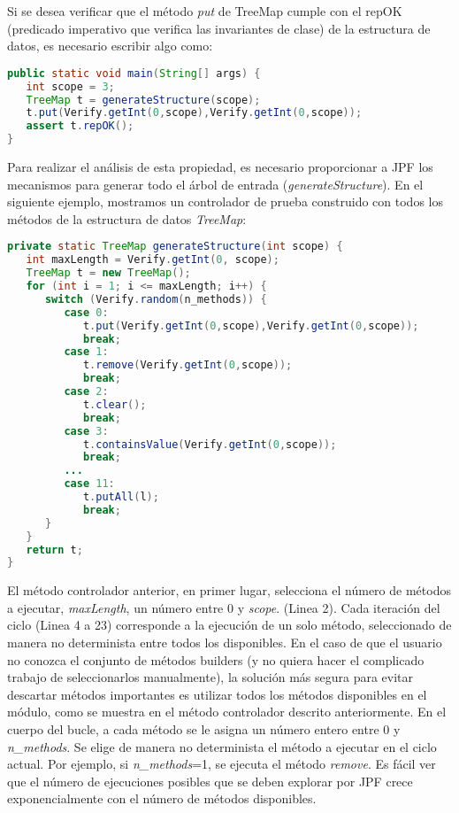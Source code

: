 Si se desea verificar que el método \emph{put}  de TreeMap cumple con el repOK (predicado imperativo que verifica las invariantes de clase) de la estructura de datos, es necesario escribir algo como: 
\vspace{5pt} 


\begin{lstlisting}[caption={Probando el método put de TreeMap con JPF},label={lst:label},language=Java,captionpos=b]
public static void main(String[] args) {
   int scope = 3;
   TreeMap t = generateStructure(scope);
   t.put(Verify.getInt(0,scope),Verify.getInt(0,scope));
   assert t.repOK();
}
\end{lstlisting}

Para realizar el análisis de esta propiedad, es necesario proporcionar a JPF los mecanismos para generar todo el árbol de entrada (\textit{generateStructure}). 
En el siguiente ejemplo, mostramos un controlador de prueba construido con todos los métodos de la estructura de datos \textit{TreeMap}:
\vspace{5pt} 

\begin{lstlisting}[caption={Controlador con todos los métodos},label={lst:driverAPI},language=Java,captionpos=b]
private static TreeMap generateStructure(int scope) {
   int maxLength = Verify.getInt(0, scope);
   TreeMap t = new TreeMap();
   for (int i = 1; i <= maxLength; i++) {
      switch (Verify.random(n_methods)) {
         case 0:
            t.put(Verify.getInt(0,scope),Verify.getInt(0,scope));
            break;
         case 1:
            t.remove(Verify.getInt(0,scope));
            break;						
         case 2:
            t.clear();
            break;
         case 3:
            t.containsValue(Verify.getInt(0,scope));
            break;
         ...
         case 11: 
            t.putAll(l);
            break;
      }
   }
   return t;
}
\end{lstlisting}

El método controlador anterior, en primer lugar, selecciona el número de métodos a ejecutar, \textit{maxLength}, un número entre 0 y \textit{scope}. (Linea 2). Cada iteración del ciclo (Linea 4 a 23) corresponde a la ejecución de un solo método, seleccionado de manera no determinista entre todos los disponibles. En el caso de que el usuario no conozca el conjunto de métodos builders (y no quiera hacer el complicado trabajo de seleccionarlos manualmente), la solución más segura para evitar descartar métodos importantes es utilizar todos los métodos disponibles en el módulo, como se muestra en el método controlador descrito anteriormente. En el cuerpo del bucle, a cada método se le asigna un número entero entre 0 y \textit{n\_methods}. Se elige de manera no determinista el método a ejecutar en el ciclo actual. Por ejemplo, si \textit{n\_methods}=1, se ejecuta el método \textit{remove}. Es fácil ver que el número de ejecuciones posibles que se deben explorar por JPF crece exponencialmente con el número de métodos disponibles.

